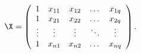 \begin{eqnarray*}
\X = \left( \begin{array}{ccccc}
            1 & x_{11} & x_{12} & \dots & x_{1q} \\
            1 & x_{21} & x_{22} & \dots & x_{2q} \\
            \vdots & \vdots & \vdots & \ddots & \vdots \\
            1 & x_{n1} & x_{n2} & \dots & x_{nq}  \\
            \end{array} \right).
\end{eqnarray*}
